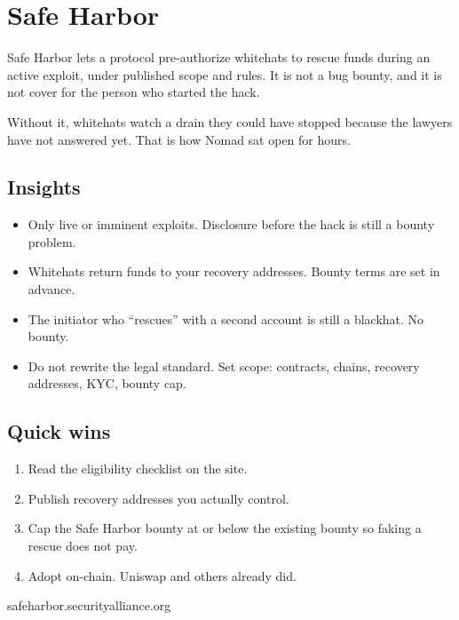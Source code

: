 \chapter{Safe Harbor}

Safe Harbor lets a protocol pre-authorize whitehats to
rescue funds during an active exploit, under published
scope and rules. It is not a bug bounty, and it is not
cover for the person who started the hack.

Without it, whitehats watch a drain they could have
stopped because the lawyers have not answered yet. That
is how Nomad sat open for hours.

\section{Insights}

\begin{itemize}
  \item Only live or imminent exploits. Disclosure
  before the hack is still a bounty problem.
  \item Whitehats return funds to your recovery
  addresses. Bounty terms are set in advance.
  \item The initiator who ``rescues'' with a second
  account is still a blackhat. No bounty.
  \item Do not rewrite the legal standard. Set scope:
  contracts, chains, recovery addresses, KYC, bounty
  cap.
\end{itemize}

\section{Quick wins}

\begin{enumerate}
  \item Read the eligibility checklist on the site.
  \item Publish recovery addresses you actually control.
  \item Cap the Safe Harbor bounty at or below the
  existing bounty so faking a rescue does not pay.
  \item Adopt on-chain. Uniswap and others already did.
\end{enumerate}

{\fontsize{7}{9}\selectfont\ttfamily
safeharbor.securityalliance.org}
